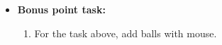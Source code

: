 \begin{itemize}
\item \textbf{Bonus point task:}
    \begin{enumerate}
    \item For the task above, add balls with mouse.
    \end{enumerate}
    	
  \end{itemize}  

\clearpage